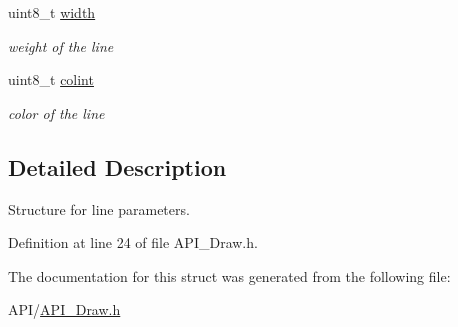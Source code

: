 \begin{DoxyCompactItemize}
\mbox{\label{struct_l_i_n_e_a09a2a45f731b02946ff6d3cd15c1a476}} 
uint8\+\_\+t \hyperlink{struct_l_i_n_e_a09a2a45f731b02946ff6d3cd15c1a476}{width}
\begin{DoxyCompactList}\small\item\em weight of the line \end{DoxyCompactList}\item 
\mbox{\label{struct_l_i_n_e_a21caa4b27a71b7967f1a2d64f196a674}} 
uint8\+\_\+t \hyperlink{struct_l_i_n_e_a21caa4b27a71b7967f1a2d64f196a674}{colint}
\begin{DoxyCompactList}\small\item\em color of the line \end{DoxyCompactList}\end{DoxyCompactItemize}


\subsection{Detailed Description}
Structure for line parameters. 

Definition at line 24 of file A\+P\+I\+\_\+\+Draw.\+h.



The documentation for this struct was generated from the following file\+:\begin{DoxyCompactItemize}
\item 
A\+P\+I/\hyperlink{_a_p_i___draw_8h}{A\+P\+I\+\_\+\+Draw.\+h}\end{DoxyCompactItemize}
